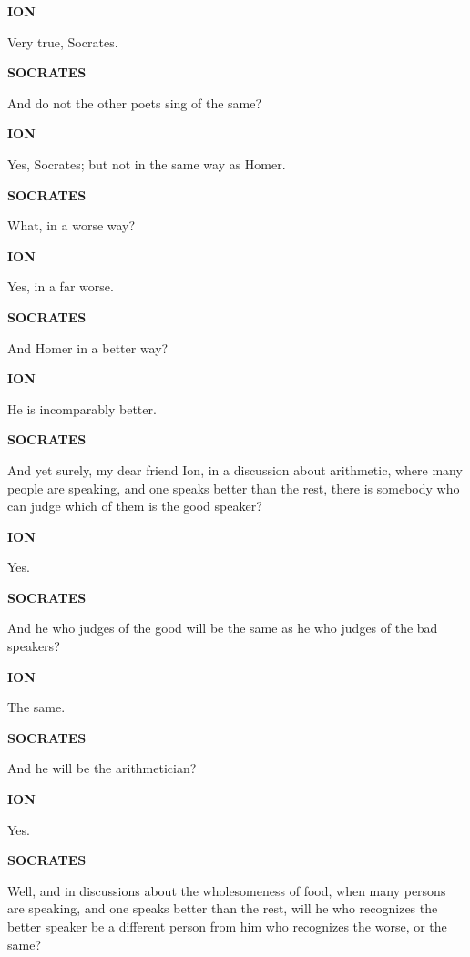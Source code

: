 \documentclass[11pt,letter]{article}
\begin{document}
\par \textbf{ION}
\par   Very true, Socrates.

\par \textbf{SOCRATES}
\par   And do not the other poets sing of the same?

\par \textbf{ION}
\par   Yes, Socrates; but not in the same way as Homer.

\par \textbf{SOCRATES}
\par   What, in a worse way?

\par \textbf{ION}
\par   Yes, in a far worse.

\par \textbf{SOCRATES}
\par   And Homer in a better way?

\par \textbf{ION}
\par   He is incomparably better.

\par \textbf{SOCRATES}
\par   And yet surely, my dear friend Ion, in a discussion about arithmetic, where many people are speaking, and one speaks better than the rest, there is somebody who can judge which of them is the good speaker?

\par \textbf{ION}
\par   Yes.

\par \textbf{SOCRATES}
\par   And he who judges of the good will be the same as he who judges of the bad speakers?

\par \textbf{ION}
\par   The same.

\par \textbf{SOCRATES}
\par   And he will be the arithmetician?

\par \textbf{ION}
\par   Yes.

\par \textbf{SOCRATES}
\par   Well, and in discussions about the wholesomeness of food, when many persons are speaking, and one speaks better than the rest, will he who recognizes the better speaker be a different person from him who recognizes the worse, or the same?
\end{document}
